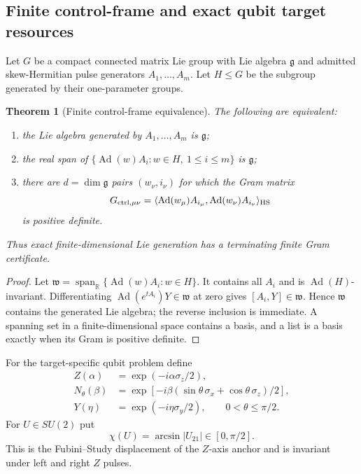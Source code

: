 \documentclass[11pt]{article}
\newtheorem{theorem}{Theorem}[section]
\theoremstyle{definition}
\theoremstyle{remark}
\newcommand{\R}{\mathbb R}
\newcommand{\Ad}{\operatorname{Ad}}
\newcommand{\HS}{\mathrm{HS}}
\newcommand{\Span}{\operatorname{span}}
\begin{document}
\subsection{Finite control-frame and exact qubit target resources}

Let $G$ be a compact connected matrix Lie group with Lie algebra $\mathfrak g$
and admitted skew-Hermitian pulse generators $A_1,\ldots,A_m$.  Let $H\le G$
be the subgroup generated by their one-parameter groups.

\begin{theorem}[Finite control-frame equivalence]
\label{thm:control-frame-equivalence-master}
The following are equivalent:
\begin{enumerate}[label=\textup{(\roman*)},leftmargin=2.8em]
\item the Lie algebra generated by $A_1,\ldots,A_m$ is $\mathfrak g$;
\item the real span of
      $\{\Ad(w)A_i:w\in H,\ 1\le i\le m\}$ is $\mathfrak g$;
\item there are $d=\dim\mathfrak g$ pairs $(w_\nu,i_\nu)$ for which the Gram
      matrix
      \[
        G_{\rm ctrl,\mu\nu}
        =\langle\Ad(w_\mu)A_{i_\mu},
                 \Ad(w_\nu)A_{i_\nu}\rangle_{\HS}
      \]
      is positive definite.
\end{enumerate}
Thus exact finite-dimensional Lie generation has a terminating finite Gram
certificate.
\end{theorem}

\begin{proof}
Let
$\mathfrak w=\Span_{\R}\{\Ad(w)A_i:w\in H\}$.  It contains all $A_i$ and is
$\Ad(H)$-invariant.  Differentiating
$\Ad(e^{tA_i})Y\in\mathfrak w$ at zero gives $[A_i,Y]\in\mathfrak w$.
Hence $\mathfrak w$ contains the generated Lie algebra; the reverse inclusion
is immediate.  A spanning set in a finite-dimensional space contains a basis,
and a list is a basis exactly when its Gram is positive definite.
\end{proof}

For the target-specific qubit problem define
\begin{align*}
  Z(\alpha)&=\exp(-i\alpha\sigma_z/2),\\
  N_\theta(\beta)&=\exp[-i\beta
   (\sin\theta\,\sigma_x+\cos\theta\,\sigma_z)/2],\\
  Y(\eta)&=\exp(-i\eta\sigma_y/2),
  \qquad 0<\theta\le\pi/2.
\end{align*}
For $U\in SU(2)$ put
\[
  \chi(U)=\arcsin|U_{21}|\in[0,\pi/2].
\]
This is the Fubini--Study displacement of the $Z$-axis anchor and is invariant
under left and right $Z$ pulses.
\end{document}

